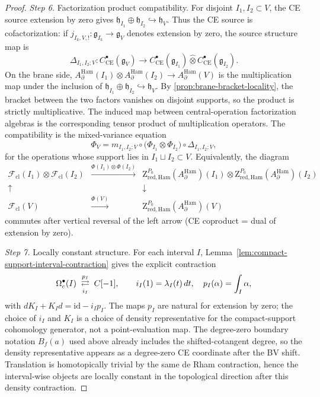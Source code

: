 \documentclass[11pt]{memoir}
\begin{document}
\begin{proof}
  \emph{Step 6.} Factorization product compatibility. For disjoint
  $I_1,I_2\subset V$, the CE source extension by zero gives
  $\mathfrak h_{I_1}\oplus\mathfrak h_{I_2}\hookrightarrow\mathfrak h_V$.
  Thus the CE source is cofactorization: if
  \(j_{I_k,V,!}:\mathfrak g_{I_k}\to\mathfrak g_V\) denotes extension by
  zero, the source structure map is
  \[
    \Delta_{I_1,I_2;V}\colon
    C^\bullet_{\mathrm{CE}}(\mathfrak g_V)\to
    C^\bullet_{\mathrm{CE}}(\mathfrak g_{I_1})\widehat\otimes
    C^\bullet_{\mathrm{CE}}(\mathfrak g_{I_2}).
  \]
  On the brane side,
  $A_\partial^{\mathrm{Ham}}(I_1)\otimes A_\partial^{\mathrm{Ham}}(I_2)
  \to A_\partial^{\mathrm{Ham}}(V)$ is the multiplication map under
  the inclusion of
  $\mathfrak h_{I_1}\oplus\mathfrak h_{I_2}\hookrightarrow\mathfrak h_V$.
  By \ref{prop:brane-bracket-locality}, the bracket between the two
  factors vanishes on disjoint supports, so the product is strictly
  multiplicative. The induced map between central-operation
  factorization algebras is the corresponding tensor product of
  multiplication operators. The compatibility is the mixed-variance
  equation
  \[
    \Phi_V
    =
    m_{I_1,I_2;V}\circ
    \bigl(\Phi_{I_1}\otimes\Phi_{I_2}\bigr)\circ
    \Delta_{I_1,I_2;V},
  \]
  for the operations whose support lies in \(I_1\sqcup I_2\subset V\).
  Equivalently, the diagram
  $$\begin{array}{ccc}
    \mathcal F_{\mathrm{cl}}(I_1)\otimes\mathcal F_{\mathrm{cl}}(I_2)
      &\xrightarrow{\Phi(I_1)\otimes\Phi(I_2)}
      & \mathrm Z^{P_0}_{\mathrm{red,Ham}}(A_\partial^{\mathrm{Ham}})(I_1)
        \otimes\mathrm Z^{P_0}_{\mathrm{red,Ham}}(A_\partial^{\mathrm{Ham}})(I_2)\\
    \uparrow & & \downarrow\\
    \mathcal F_{\mathrm{cl}}(V)
      &\xrightarrow{\Phi(V)}
      & \mathrm Z^{P_0}_{\mathrm{red,Ham}}(A_\partial^{\mathrm{Ham}})(V)
  \end{array}$$
  commutes after vertical reversal of the left arrow (CE coproduct =
  dual of extension by zero).

  \emph{Step 7.} Locally constant structure. For each interval \(I\),
  Lemma~\ref{lem:compact-support-interval-contraction} gives the
  explicit contraction
  \[
    \Omega_c^\bullet(I)
      \;\underset{i_I}{\stackrel{p_I}{\rightleftarrows}}\;
    C[-1],
    \qquad
    i_I(1)=\lambda_I(t)\,dt,\quad
    p_I(\alpha)=\int_I\alpha,
  \]
  with \(dK_I+K_I d=\mathrm{id}-i_Ip_I\). The maps \(p_I\) are natural for
  extension by zero; the choice of \(i_I\) and \(K_I\) is a choice of
  density representative for the compact-support cohomology generator,
  not a point-evaluation map. The
  degree-zero boundary notation \(B_f(a)\) used above already includes
  the shifted-cotangent degree, so the density representative appears as
  a degree-zero CE coordinate after the BV shift.  Translation is
  homotopically trivial by the same de Rham contraction, hence the
  interval-wise objects are locally constant in the topological direction
  after this density contraction.


\end{proof}
\end{document}
